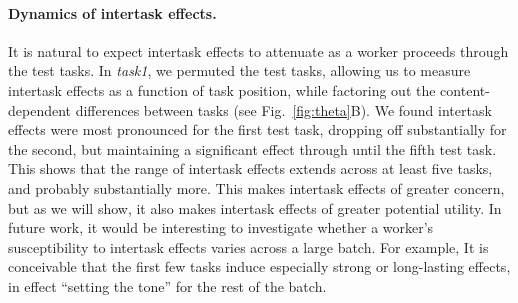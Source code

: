 \documentclass[12pt]{article}
\begin{document}
\paragraph{Dynamics of intertask effects.} It is natural to expect 
intertask effects to attenuate as a worker proceeds through the test tasks.  
In \textit{task1}, we permuted the test tasks, allowing us to 
measure intertask effects as a function of task position, while factoring
out the content-dependent differences between tasks
(see Fig.~\ref{fig:theta}B). 
We found intertask effects were most pronounced for the first test task,
dropping off substantially for the second, but maintaining a 
significant effect through until the fifth test task.  
This shows that the range of intertask effects extends across at least five 
tasks, and probably substantially more.
This makes intertask effects of greater concern, but as we will show, it also
makes intertask effects of greater potential utility.
In future work, it would be interesting to investigate whether a worker's
susceptibility to intertask effects varies across a large batch.  For example,
It is conceivable that the first few tasks induce especially strong
or long-lasting effects, in effect ``setting the tone'' for the rest of the batch.
\end{document}

